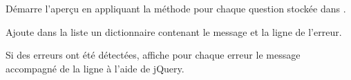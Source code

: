 \documentclass[a4paper,11pt,openany,oneside]{sphinxmanual}
\begin{document}
\begin{fulllineitems}
\begin{fulllineitems}
\end{fulllineitems}


\begin{fulllineitems}
\label{front-end:Parse.render}
Démarre l'aperçu en appliquant la méthode  pour chaque
question stockée dans .

\end{fulllineitems}


\begin{fulllineitems}
\label{front-end:Parse.error}
Ajoute dans la liste  un dictionnaire contenant le message
et la ligne de l'erreur.

\end{fulllineitems}


\begin{fulllineitems}
\label{front-end:Parse.show_errors}
Si des erreurs ont été détectées, affiche pour chaque erreur le message
accompagné de la ligne à l'aide de jQuery.

\end{fulllineitems}


\end{fulllineitems}

\end{document}
